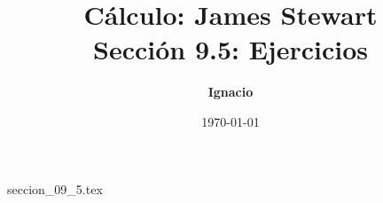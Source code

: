 \documentclass[11pt,spanish,oneside]{report}
\title{\textbf{Cálculo: James Stewart} \\ \Large Sección 9.5: Ejercicios}
\author{\textbf{Ignacio}}
\date{\today}
\begin{document}
\maketitle

{seccion_09_5.tex}
\end{document}
